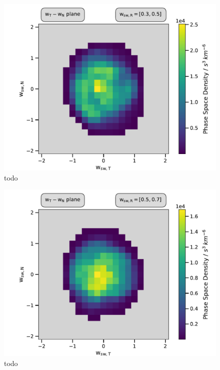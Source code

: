 \begin{figure}[h]
	\includegraphics[width=1.\textwidth]{Figures/slices_50_3.pdf}
	\centering
	\caption{todo}
	\label{fig:todo}
\end{figure}

\begin{figure}[h]
	\includegraphics[width=1.\textwidth]{Figures/slices_50_5.pdf}
	\centering
	\caption{todo}
	\label{fig:todo}
\end{figure}

